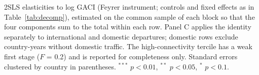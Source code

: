\documentclass[12pt]{extarticle}
\begin{document}
\begin{table}[H]
{\begin{threeparttable}
\begin{tablenotes}\scriptsize
\item 2SLS elasticities to log GACI (Feyrer instrument; controls and fixed effects as in Table~\ref{tab:decomp}), estimated on the common sample of each block so that the four components sum to the total within each row. Panel C applies the identity separately to international and domestic departures; domestic rows exclude country-years without domestic traffic. The high-connectivity tercile has a weak first stage ($F$ = 0.2) and is reported for completeness only. Standard errors clustered by country in parentheses. $^{***}$ $p<0.01$, $^{**}$ $p<0.05$, $^{*}$ $p<0.1$.
\end{tablenotes}
\end{threeparttable}}
\end{table}
\end{document}
